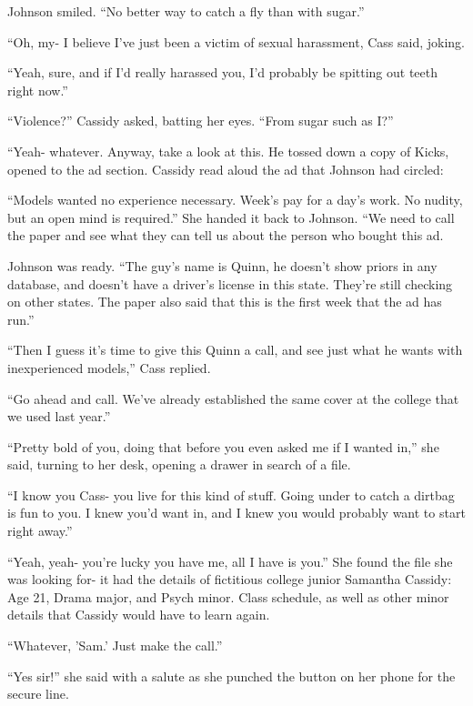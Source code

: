 Johnson smiled. ``No better way to catch a fly than with sugar.''

``Oh, my- I believe I've just been a victim of sexual harassment, Cass said, joking.

``Yeah, sure, and if I'd really harassed you, I'd probably be spitting out teeth right
now.''

``Violence?'' Cassidy asked, batting her eyes. ``From sugar such as I?''

``Yeah- whatever. Anyway, take a look at this. He tossed down a copy of Kicks, opened to the
ad section. Cassidy read aloud the ad that Johnson had circled:

``Models wanted no experience necessary. Week's pay for a day's work. No nudity, but an open
mind is required.'' She handed it back to Johnson. ``We need to call the paper and see what they
can tell us about the person who bought this ad.

Johnson was ready. ``The guy's name is Quinn, he doesn't show priors in any database, and
doesn't have a driver's license in this state. They're still checking on other states. The paper
also said that this is the first week that the ad has run.''

``Then I guess it's time to give this Quinn a call, and see just what he wants with
inexperienced models,'' Cass replied.

``Go ahead and call. We've already established the same cover at the college that we used
last year.''

``Pretty bold of you, doing that before you even asked me if I wanted in,'' she said,
turning to her desk, opening a drawer in search of a file.

``I know you Cass- you live for this kind of stuff. Going under to catch a dirtbag is fun to
you. I knew you'd want in, and I knew you would probably want to start right away.''

``Yeah, yeah- you're lucky you have me, all I have is you.'' She found the file she was
looking for- it had the details of fictitious college junior Samantha Cassidy: Age 21, Drama
major, and Psych minor. Class schedule, as well as other minor details that Cassidy would have
to learn again.

``Whatever, 'Sam.' Just make the call.''

``Yes sir!'' she said with a salute as she punched the button on her phone for the secure
line.
